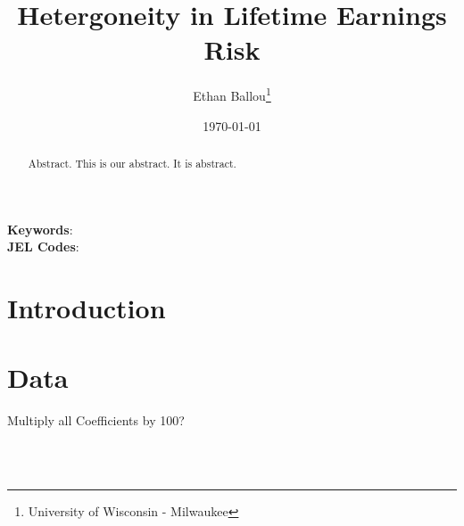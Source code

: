 \documentclass[12pt]{article}
\title{Hetergoneity in Lifetime Earnings Risk}
\author{Ethan Ballou\thanks{University of Wisconsin - Milwaukee}}
\date{\today}
\begin{document}
\maketitle
\thispagestyle{empty}



\begin{abstract}
\begin{singlespace}
\noindent 
Abstract.  This is our abstract.  It is abstract.  
\end{singlespace}
\end{abstract}
\noindent
\textbf{Keywords}: \\
\textbf{JEL Codes}: \\






\clearpage
\setcounter{page}{1}
\begin{center}
\end{center}

\section{Introduction}


\section{Data}

Multiply all Coefficients by 100?

\\
\\ 
\end{document}
